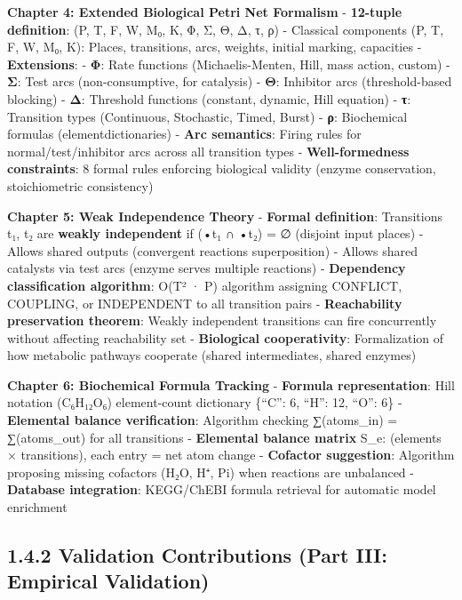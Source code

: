 \textbf{Chapter 4: Extended Biological Petri Net Formalism} -
\textbf{12-tuple definition}: (P, T, F, W, M₀, K, Φ, Σ, Θ, Δ, τ, ρ) -
Classical components (P, T, F, W, M₀, K): Places, transitions, arcs,
weights, initial marking, capacities - \textbf{Extensions}: -
\textbf{Φ}: Rate functions (Michaelis-Menten, Hill, mass action, custom)
- \textbf{Σ}: Test arcs (non-consumptive, for catalysis) - \textbf{Θ}:
Inhibitor arcs (threshold-based blocking) - \textbf{Δ}: Threshold
functions (constant, dynamic, Hill equation) - \textbf{τ}: Transition
types (Continuous, Stochastic, Timed, Burst) - \textbf{ρ}: Biochemical
formulas (element\textrightarrowcount dictionaries) - \textbf{Arc semantics}: Firing
rules for normal/test/inhibitor arcs across all transition types -
\textbf{Well-formedness constraints}: 8 formal rules enforcing
biological validity (enzyme conservation, stoichiometric consistency)

\textbf{Chapter 5: Weak Independence Theory} - \textbf{Formal
definition}: Transitions t₁, t₂ are \textbf{weakly independent} if (•t₁
∩ •t₂) = ∅ (disjoint input places) - Allows shared outputs (convergent
reactions \textrightarrow superposition) - Allows shared catalysts via test arcs
(enzyme serves multiple reactions) - \textbf{Dependency classification
algorithm}: O(\textbar T\textbar² · \textbar P\textbar) algorithm
assigning CONFLICT, COUPLING, or INDEPENDENT to all transition pairs -
\textbf{Reachability preservation theorem}: Weakly independent
transitions can fire concurrently without affecting reachability set -
\textbf{Biological cooperativity}: Formalization of how metabolic
pathways cooperate (shared intermediates, shared enzymes)

\textbf{Chapter 6: Biochemical Formula Tracking} - \textbf{Formula
representation}: Hill notation (C₆H₁₂O₆) \textrightarrow element-count dictionary
\{``C'': 6, ``H'': 12, ``O'': 6\} - \textbf{Elemental balance
verification}: Algorithm checking ∑(atoms\_in) = ∑(atoms\_out) for all
transitions - \textbf{Elemental balance matrix} S\_e: (elements ×
transitions), each entry = net atom change - \textbf{Cofactor
suggestion}: Algorithm proposing missing cofactors (H₂O, H⁺, Pi) when
reactions are unbalanced - \textbf{Database integration}: KEGG/ChEBI
formula retrieval for automatic model enrichment

\hypertarget{validation-contributions-part-iii-empirical-validation}{%
\subsection{1.4.2 Validation Contributions (Part III: Empirical
Validation)}\label{validation-contributions-part-iii-empirical-validation}}

